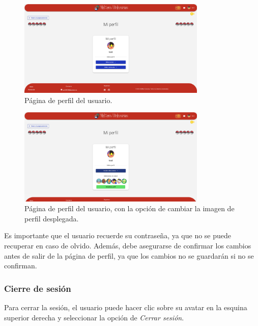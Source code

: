 \begin{figure}[H]
    \centering
    \includegraphics[width=0.8\textwidth]{figures/6-Analisis/6-Interfaz/interfaz/perfil1.png}
    \caption{Página de perfil del usuario.}
    \label{fig:m-interfaz-perfil1}
\end{figure}


\begin{figure}[H]
    \centering
    \includegraphics[width=0.8\textwidth]{figures/6-Analisis/6-Interfaz/interfaz/perfil2.png}
    \caption{Página de perfil del usuario, con la opción de cambiar la imagen de perfil desplegada.}
    \label{fig:m-interfaz-perfil2}
\end{figure}

Es importante que el usuario recuerde su contraseña, ya que no se puede recuperar en caso de olvido.
Además, debe asegurarse de confirmar los cambios antes de salir de la página de perfil, ya que los cambios no se guardarán si no se confirman.

\subsubsection{Cierre de sesión}
Para cerrar la sesión, el usuario puede hacer clic sobre  su avatar en la esquina superior derecha y seleccionar la opción de \textit{Cerrar sesión}.







